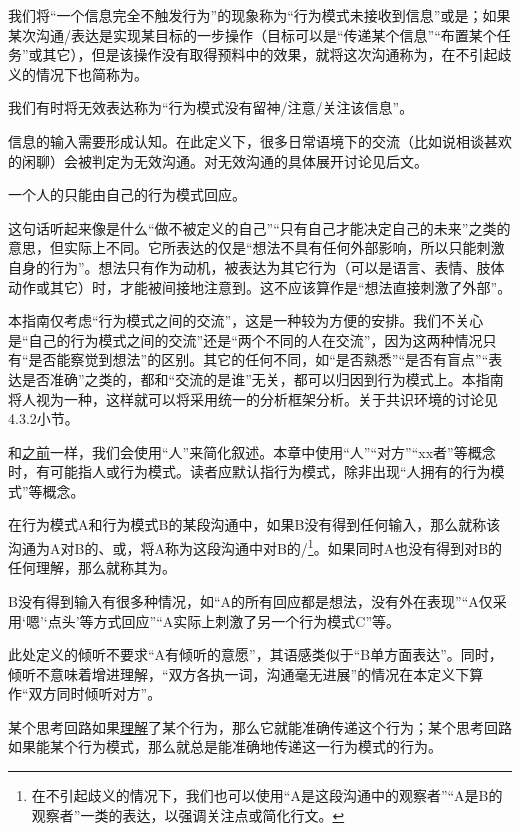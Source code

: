 我们将“一个信息完全不触发行为”的现象称为“行为模式未接收到信息”或是；如果某次沟通/表达是实现某目标的一步操作（目标可以是“传递某个信息”“布置某个任务”或其它），但是该操作没有取得预料中的效果，就将这次沟通称为，在不引起歧义的情况下也简称为。
\begin{explain}
我们有时将无效表达称为“行为模式没有留神/注意/关注该信息”。

信息的输入需要形成认知。在此定义下，很多日常语境下的交流（比如说相谈甚欢的闲聊）会被判定为无效沟通。对无效沟通的具体展开讨论见后文。
\end{explain}
一个人的只能由自己的行为模式回应。
\begin{examples}
这句话听起来像是什么“做不被定义的自己”“只有自己才能决定自己的未来”之类的意思，但实际上不同。它所表达的仅是“想法不具有任何外部影响，所以只能刺激自身的行为”。想法只有作为动机，被表达为其它行为（可以是语言、表情、肢体动作或其它）时，才能被间接地注意到。这不应该算作是“想法直接刺激了外部”。

本指南仅考虑“行为模式之间的交流”，这是一种较为方便的安排。我们不关心是“自己的行为模式之间的交流”还是“两个不同的人在交流”，因为这两种情况只有“是否能察觉到想法”的区别。其它的任何不同，如“是否熟悉”“是否有盲点”“表达是否准确”之类的，都和“交流的是谁”无关，都可以归因到行为模式上。本指南将人视为一种，这样就可以将采用统一的分析框架分析。关于共识环境的讨论见4.3.2小节。

和\hyperref[para:不研究人]{之前}一样，我们会使用“人”来简化叙述。本章中使用“人”“对方”“xx者”等概念时，有可能指人或行为模式。读者应默认指行为模式，除非出现“人拥有的行为模式”等概念。
\end{examples}
在行为模式A和行为模式B的某段沟通中，如果B没有得到任何输入，那么就称该沟通为A对B的、或，将A称为这段沟通中对B的/\footnote{在不引起歧义的情况下，我们也可以使用“A是这段沟通中的观察者”“A是B的观察者”一类的表达，以强调关注点或简化行文。}。如果同时A也没有得到对B的任何理解，那么就称其为。
\begin{explain}
B没有得到输入有很多种情况，如“A的所有回应都是想法，没有外在表现”“A仅采用‘嗯’‘点头’等方式回应”“A实际上刺激了另一个行为模式C”等。

此处定义的倾听不要求“A有倾听的意愿”，其语感类似于“B单方面表达”。同时，倾听不意味着增进理解，“双方各执一词，沟通毫无进展”的情况在本定义下算作“双方同时倾听对方”。
\end{explain}
某个思考回路如果\hyperref[def:理解行为模式]{理解}了某个行为，那么它就能准确传递这个行为；某个思考回路如果能某个行为模式，那么就总是能准确地传递这一行为模式的行为。

